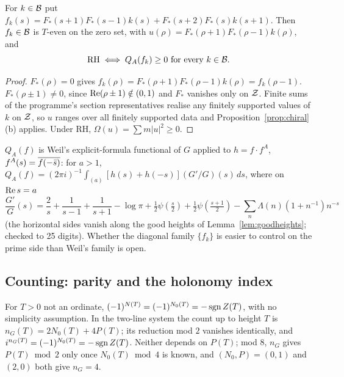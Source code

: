 \begin{corollary}\label{cor:chiral}
For $k\in\mathcal{B}$ put $f_k(s)=F_*(s+1)F_*(s-1)k(s)+F_*(s+2)F_*(s)k(s+1)$. Then $f_k\in\mathcal{B}$ is $T$-even on the zero set, with $u(\rho)=F_*(\rho+1)F_*(\rho-1)k(\rho)$, and
\[
\text{RH}\iff Q_A(f_k)\ge0\ \text{for every }k\in\mathcal{B} .
\]
\end{corollary}

\begin{proof}
$F_*(\rho)=0$ gives $f_k(\rho)=F_*(\rho+1)F_*(\rho-1)k(\rho)=f_k(\rho-1)$. $F_*(\rho\pm1)\ne0$, since $\operatorname{Re}(\rho\pm1)\notin(0,1)$ and $F_*$ vanishes only on $\mathcal{Z}$. Finite sums of the programme's section representatives realise any finitely supported values of $k$ on $\mathcal{Z}$, so $u$ ranges over all finitely supported data and Proposition~\ref{prop:chiral}(b) applies. Under RH, $\Omega(u)=\sum m|u|^2\ge0$.
\end{proof}

$Q_A(f)$ is Weil's explicit-formula functional of $G$ applied to $h=f\cdot f^A$, $f^A(s)=\overline{f(-\bar s)}$: for $a>1$, $Q_A(f)=(2\pi i)^{-1}\int_{(a)}[h(s)+h(-s)](G'/G)(s)\,ds$, where on $\operatorname{Re} s=a$
\[
\frac{G'}{G}(s)=\frac2s+\frac1{s-1}+\frac1{s+1}-\log\pi+\tfrac12\psi(\tfrac s2)+\tfrac12\psi(\tfrac{s+1}2)-\sum_n\Lambda(n)(1+n^{-1})n^{-s}
\]
(the horizontal sides vanish along the good heights of Lemma~\ref{lem:goodheights}; checked to 25 digits). Whether the diagonal family $\{f_k\}$ is easier to control on the prime side than Weil's family is open.

\subsection{Counting: parity and the holonomy index}

\begin{proposition}\label{prop:parity}
For $T>0$ not an ordinate, $(-1)^{N(T)}=(-1)^{N_0(T)}=-\operatorname{sgn} Z(T)$, with no simplicity assumption. In the two-line system the count up to height $T$ is $n_G(T)=2N_0(T)+4P(T)$; its reduction mod $2$ vanishes identically, and $i^{n_G(T)}=(-1)^{N_0(T)}=-\operatorname{sgn} Z(T)$. Neither depends on $P(T)$; mod $8$, $n_G$ gives $P(T)\bmod2$ only once $N_0(T)\bmod4$ is known, and $(N_0,P)=(0,1)$ and $(2,0)$ both give $n_G=4$.
\end{proposition}


